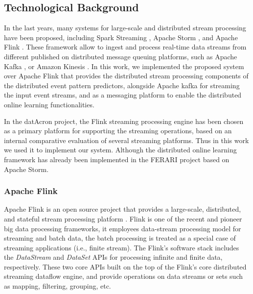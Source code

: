 \subsection{Technological Background}

\par In the last years, many systems for large-scale and distributed stream processing have been proposed, including Spark Streaming \cite{Spark},  Apache Storm \cite{Storm}, and Apache Flink \cite{Flink}. These framework allow to ingest and process real-time data streams from different published on distributed message queuing platforms, such as Apache Kafka \cite{Kafka}, or  Amazon Kinesis \cite{Kinesis}. In this work, we implemented the proposed system over Apache Flink that provides the distributed stream processing components of the distributed event pattern predictors, alongside Apache kafka for streaming the input event streams, and as a messaging platform to enable the distributed online learning functionalities.


\par In the datAcron project, the Flink streaming processing engine has been chosen as a primary platform for supporting the streaming operations, based on an internal comparative evaluation of several streaming platforms. Thus in this work we used it to implement our system. Although the distributed online learning framework has already been implemented in the FERARI project \cite{flouris2016ferari} based on Apache Storm.


\subsubsection*{Apache Flink}

\par Apache Flink is an open source project that provides a large-scale, distributed,  and stateful stream processing platform \cite{carbone2015apache}. Flink is one of the recent and pioneer big data processing frameworks, it employees data-stream processing model for streaming and batch data, the batch processing is treated as a special case of streaming applications (i.e., finite stream). The Flink's software stack includes the \textit{DataStream} and \textit{DataSet} APIs for processing infinite and finite data, respectively. These two core APIs built on the top of the Flink's core distributed streaming dataflow engine, and provide operations on data streams or sets such as mapping, filtering, grouping, etc.

